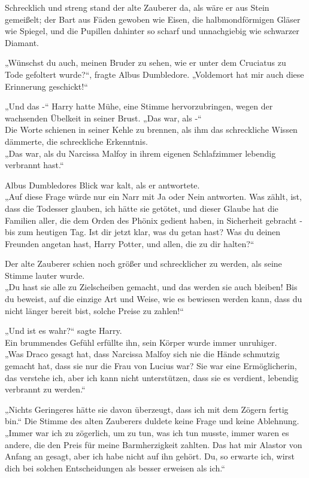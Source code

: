 {Schrecklich und streng stand der alte Zauberer da, als wäre er aus Stein gemeißelt; der Bart aus Fäden gewoben wie Eisen, die halbmondförmigen Gläser wie Spiegel, und die Pupillen dahinter so scharf und unnachgiebig wie schwarzer Diamant.

„Wünschst du auch, meinen Bruder zu sehen, wie er unter dem Cruciatus zu Tode gefoltert wurde?“, fragte Albus Dumbledore. „Voldemort hat mir auch diese Erinnerung geschickt!“

„Und das -“ Harry hatte Mühe, eine Stimme hervorzubringen, wegen der wachsenden Übelkeit in seiner Brust. „Das war, als -“\\ Die Worte schienen in seiner Kehle zu brennen, als ihm das schreckliche Wissen dämmerte, die schreckliche Erkenntnis.\\ „Das war, als du Narcissa Malfoy in ihrem eigenen Schlafzimmer lebendig verbrannt hast.“

Albus Dumbledores Blick war kalt, als er antwortete.\\ „Auf diese Frage würde nur ein Narr mit Ja oder Nein antworten. Was zählt, ist, dass die Todesser glauben, ich hätte sie getötet, und dieser Glaube hat die Familien aller, die dem Orden des Phönix gedient haben, in Sicherheit gebracht - bis zum heutigen Tag. Ist dir jetzt klar, was du getan hast? Was du deinen Freunden angetan hast, Harry Potter, und allen, die zu dir halten?“

Der alte Zauberer schien noch größer und schrecklicher zu werden, als seine Stimme lauter wurde.\\ „Du hast sie alle zu Zielscheiben gemacht, und das werden sie auch bleiben! Bis du beweist, auf die einzige Art und Weise, wie es bewiesen werden kann, dass du nicht länger bereit bist, solche Preise zu zahlen!“

„Und ist es wahr?“ sagte Harry.\\ Ein brummendes Gefühl erfüllte ihn, sein Körper wurde immer unruhiger.\\ „Was Draco gesagt hat, dass Narcissa Malfoy sich nie die Hände schmutzig gemacht hat, dass sie nur die Frau von Lucius war? Sie war eine Ermöglicherin, das verstehe ich, aber ich kann nicht unterstützen, dass sie es verdient, lebendig verbrannt zu werden.“

„Nichts Geringeres hätte sie davon überzeugt, dass ich mit dem Zögern fertig bin.“ Die Stimme des alten Zauberers duldete keine Frage und keine Ablehnung.\\ „Immer war ich zu zögerlich, um zu tun, was ich tun musste, immer waren es andere, die den Preis für meine Barmherzigkeit zahlten. Das hat mir Alastor von Anfang an gesagt, aber ich habe nicht auf ihn gehört. Du, so erwarte ich, wirst dich bei solchen Entscheidungen als besser erweisen als ich.“

}
